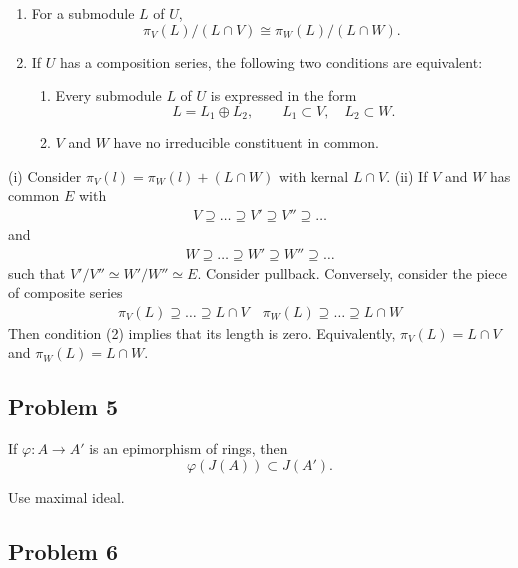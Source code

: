 \begin{enumerate}
    \item[(i)] For a submodule \(L\) of \(U\),
    \[
    \pi_V(L)/(L\cap V)\cong \pi_W(L)/(L\cap W).
    \]

    \item[(ii)] If \(U\) has a composition series, the following two conditions
    are equivalent:
    \begin{enumerate}
        \item[(1)] Every submodule \(L\) of \(U\) is expressed in the form
        \[
        L=L_1\oplus L_2,
        \qquad
        L_1\subset V,\quad L_2\subset W.
        \]
        \item[(2)] \(V\) and \(W\) have no irreducible constituent in common.
    \end{enumerate}
\end{enumerate}
\begin{solution}
    (i) Consider $\pi_V(l) = \pi_W(l)+(L\cap W)$ with kernal $L\cap V.$ 
    (ii) If $V$ and $W$ has common $E$ with 
    \begin{align*}
        V\supseteq \dots \supseteq V' \supseteq V''  \supseteq \dots
    \end{align*}
    and 
    \begin{align*}
        W\supseteq \dots \supseteq W' \supseteq W''  \supseteq\dots
    \end{align*}
    such that $V'/V''\simeq W'/W''\simeq E$. Consider pullback.
    Conversely, consider the piece of composite series 
    \begin{align*}
        \pi_V(L) \supseteq \dots \supseteq L\cap V \quad 
        \pi_W(L) \supseteq \dots \supseteq L\cap W
    \end{align*}
    Then condition (2) implies that its length is zero. Equivalently, $\pi_V(L) = L\cap V$ and $\pi_W(L) = L\cap W.$
\end{solution}
\subsection{Problem 5}

If \(\varphi:A\to A'\) is an epimorphism of rings, then
\[
\varphi(J(A))\subset J(A').
\]
\begin{solution}
    Use maximal ideal.
\end{solution}
\subsection{Problem 6}

